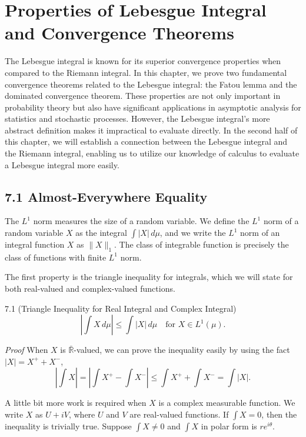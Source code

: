 \section*{Properties of Lebesgue Integral and Convergence Theorems}

The Lebesgue integral is known for its superior convergence properties when compared to the Riemann integral. In this chapter, we prove two fundamental convergence theorems related to the Lebesgue integral: the Fatou lemma and the dominated convergence theorem. These properties are not only important in probability theory but also have significant applications in asymptotic analysis for statistics and stochastic processes. However, the Lebesgue integral's more abstract definition makes it impractical to evaluate directly. In the second half of this chapter, we will establish a connection between the Lebesgue integral and the Riemann integral, enabling us to utilize our knowledge of calculus to evaluate a Lebesgue integral more easily.

\subsection*{7.1 Almost-Everywhere Equality}

The $L^1$ norm measures the size of a random variable. We define the $L^1$ norm of a random variable $X$ as the integral $\int |X|\, d\mu$, and we write the $L^1$ norm of an integral function $X$ as $\|X\|_1$. The class of integrable function is precisely the class of functions with finite $L^1$ norm.

The first property is the triangle inequality for integrals, which we will state for both real-valued and complex-valued functions.

\begin{thmbox}{7.1 (Triangle Inequality for Real Integral and Complex Integral)}
\[
\left|\int X\, d\mu\right| \le \int |X|\, d\mu \quad \text{for } X \in L^1(\mu).
\]
\end{thmbox}

\textit{Proof} When $X$ is $\bar{\mathbb{R}}$-valued, we can prove the inequality easily by using the fact $|X| = X^+ + X^-$,
\[
\left|\int X\right|
=
\left|\int X^+ - \int X^-\right|
\le
\int X^+ + \int X^-
=
\int |X|.
\]

A little bit more work is required when $X$ is a complex measurable function. We write $X$ as $U+iV$, where $U$ and $V$ are real-valued functions. If $\int X = 0$, then the inequality is trivially true. Suppose $\int X \neq 0$ and $\int X$ in polar form is $re^{i\theta}$.

